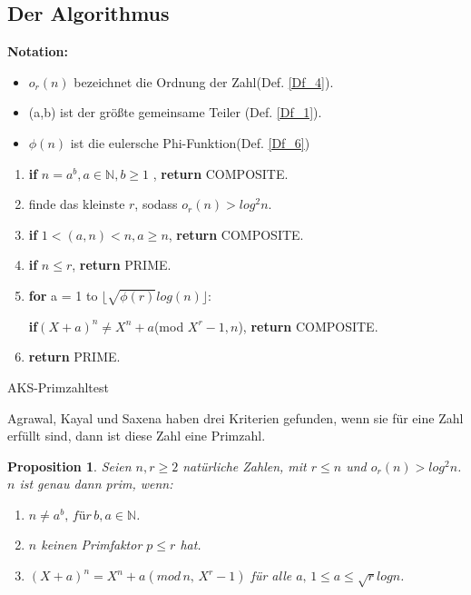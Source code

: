 \documentclass[12pt,oneside]{article}
\newtheorem{prop}{Proposition}[section]
\theoremstyle{remark}
\theoremstyle{definition}
\begin{document}
\subsection{Der Algorithmus}\label{algo}
\textbf{Notation:}
\begin{itemize}
    \item $o_r(n)$ bezeichnet die Ordnung der
Zahl(Def. \ref{Df_4}).
    \item (a,b) ist der größte gemeinsame Teiler (Def. \ref{Df_1}).
\item $\phi(n)$ ist die eulersche Phi-Funktion(Def. \ref{Df_6})  
\end{itemize}
\begin{algorithm}[H]
\SetAlgoLined
{}

\begin{enumerate}
\item \textbf{if} $n = a^b, a \in \mathbb{N}, b \geq 1$ , \textbf{return} COMPOSITE.
\item  finde das kleinste $r$, sodass $o_{r}(n) > log^2 n $.
\item \textbf{if} $1 < (a,n) < n, a \geq n $, \textbf{return} COMPOSITE.
\item \textbf{if} $n \leq r $, \textbf{return} PRIME.
\item \textbf{for} a = 1 to $\lfloor \sqrt{\phi(r)}log(n) \rfloor$:

 \textbf{if}$(X + a)^n \neq X^n + a $(mod $X^r - 1, n$), \textbf{return} COMPOSITE.
 \item \textbf{return} PRIME.
\end{enumerate}
 
\caption{AKS-Primzahltest}
\end{algorithm}

Agrawal, Kayal und Saxena haben drei Kriterien gefunden, wenn sie für eine Zahl erfüllt sind, dann ist diese Zahl eine Primzahl. 

\begin{prop}\label{aks-prop}
Seien $n,r \geq 2$  natürliche Zahlen, mit $ r \leq n$ und $o_{r}(n) > log^2 n$. $n$ ist genau dann prim, wenn:
\begin{enumerate}
    \item $n \neq a^b, \, für \,  b,a \in \mathbb{N}$.
    
    \item $n$ keinen Primfaktor $p \leq r$ hat.
    
    \item $(X + a)^n = X^n + a (mod \, n, \, X^r - 1)$ für alle $ a, \, 1 \leq a \leq \sqrt{r} log n$.
\end{enumerate}
\end{prop}
\end{document}
